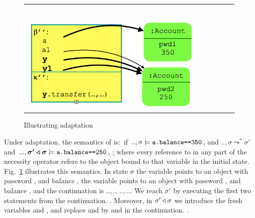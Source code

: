 \begin{figure}[htbp]
\begin{tabular}{clclc}
\begin{minipage}{0.27\textwidth}
   \end{minipage}
   & \ \ \  &
    \begin{minipage}{0.27\textwidth}
$\adapt {\sigma'}{\sigma}:$\\
  \includegraphics[width=\linewidth]{diagrams/adapt3.png}
   \end{minipage}
\end{tabular}
\caption{Illustrating adaptation
}
\label{fig:Adaptation}
\end{figure}




Under adaptation, the semantics of \Sadapt is:\  if $..,\sigma \models {\texttt{a.balance==350}}$,
and  $.., \sigma \leadsto^* \sigma'$ and $..., \boldsymbol{\sigma' \triangleleft \sigma} \models {\texttt{a.balance==250}}$,
;
where every reference to  in any part of the necessity operator
refers to the object bound to that variable in the initial state.
%
Fig.~\ref{fig:Adaptation} illustrates this semantics. In state $\sigma$ the variable  points to an 
object with password , and balance ,  the variable  points to an 
object with password , and balance , and the continuation is $..,..$\prg{);} 
$..,..$\prg{);}. 
We reach $\sigma'$ by executing the first two statements from the continuation.
.
Moreover, in $\sigma' \triangleleft \sigma$ we introduce the fresh variables  and , and replace  and
 by  and  in the continuation.
.

